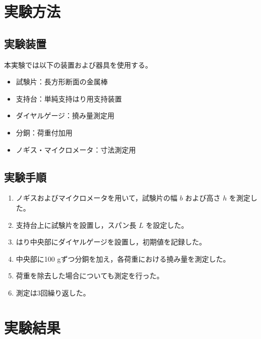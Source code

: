 \documentclass[10pt,a4paper,titlepage]{jreport}
\begin{document}
\chapter{実験方法}

\section{実験装置}

本実験では以下の装置および器具を使用する。

\begin{itemize}
    \item 試験片：長方形断面の金属棒
    \item 支持台：単純支持はり用支持装置
    \item ダイヤルゲージ：撓み量測定用
    \item 分銅：荷重付加用
    \item ノギス・マイクロメータ：寸法測定用
\end{itemize}

\section{実験手順}

\begin{enumerate}
    \item ノギスおよびマイクロメータを用いて，試験片の幅 $b$ および高さ $h$ を測定した。
    
    \item 支持台上に試験片を設置し，スパン長 $L$ を設定した。
    
    \item はり中央部にダイヤルゲージを設置し，初期値を記録した。
    
    \item 中央部に100 gずつ分銅を加え，各荷重における撓み量を測定した。
    
    \item 荷重を除去した場合についても測定を行った。
    
    \item 測定は3回繰り返した。
\end{enumerate}

\chapter{実験結果}
\end{document}
